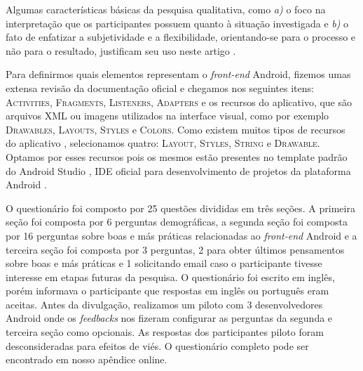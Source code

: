 Algumas características básicas da pesquisa qualitativa, como \textit{a)} o foco na interpretação que os participantes possuem quanto à situação investigada e \textit{b)} o fato de enfatizar a subjetividade e a flexibilidade, orientando-se para o processo e não para o resultado, justificam seu uso neste artigo \cite{Prates2015, King1994}.

Para definirmos quais elementos representam o \textit{front-end} Android, fizemos umas extensa revisão da documentação oficial e chegamos nos seguintes itens: \textsc{Activities}, \textsc{Fragments}, \textsc{Listeners}, \textsc{Adapters} e os recursos do aplicativo, que são arquivos XML ou imagens utilizados na interface visual, como por exemplo \textsc{Drawables}, \textsc{Layouts}, \textsc{Styles} e \textsc{Colors}. Como existem muitos tipos de recursos do aplicativo \cite{AndroidResourcesOverview}, selecionamos quatro: \textsc{Layout}, \textsc{Styles}, \textsc{String} e \textsc{Drawable}. Optamos por esses recursos pois os mesmos estão presentes no template padrão do Android Studio \cite{FirstApp2017}, IDE oficial para desenvolvimento de projetos da plataforma Android \cite{AndroidStudio}.

O questionário foi composto por 25 questões divididas em três seções. A primeira seção foi composta por 6 perguntas demográficas, a segunda seção foi composta por 16 perguntas sobre boas e más práticas relacionadas ao \textit{front-end} Android e a terceira seção foi composta por 3 perguntas, 2 para obter últimos pensamentos sobre boas e más práticas e 1 solicitando email caso o participante tivesse interesse em etapas futuras da pesquisa. O questionário foi escrito em inglês, porém informava o participante que respostas em inglês ou português eram aceitas. Antes da divulgação, realizamos um piloto com 3 desenvolvedores Android onde os \textit{feedbacks} nos fizeram configurar as perguntas da segunda e terceira seção como opcionais. As respostas dos participantes piloto foram desconsideradas para efeitos de viés. O questionário completo pode ser encontrado em nosso apêndice online.


